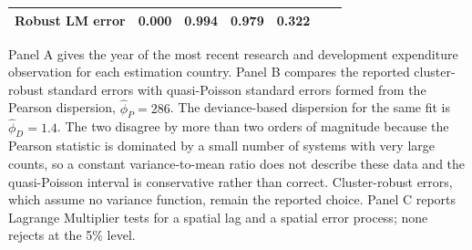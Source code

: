 \begin{table}[!t]
\begin{tabular*}{\textwidth}{@{\extracolsep\fill}l r r r r r r@{}}
Robust LM error & 0.000 & 0.994 & 0.979 & 0.322 & \\
\bottomrule
\end{tabular*}
\begin{tablenotes}
\item[] Panel A gives the year of the most recent research and development expenditure observation for each estimation country. Panel B compares the reported cluster-robust standard errors with quasi-Poisson standard errors formed from the Pearson dispersion, $\hat\phi_{P} = 286$. The deviance-based dispersion for the same fit is $\hat\phi_{D} = 1.4$. The two disagree by more than two orders of magnitude because the Pearson statistic is dominated by a small number of systems with very large counts, so a constant variance-to-mean ratio does not describe these data and the quasi-Poisson interval is conservative rather than correct. Cluster-robust errors, which assume no variance function, remain the reported choice. Panel C reports Lagrange Multiplier tests for a spatial lag and a spatial error process; none rejects at the 5\% level.
\end{tablenotes}
\end{table}
